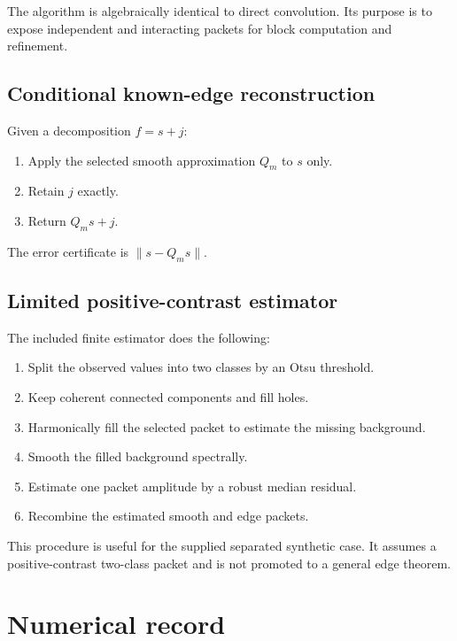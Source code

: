 \documentclass[11pt,letterpaper]{article}
\theoremstyle{plain}
\theoremstyle{plain}
\theoremstyle{plain}
\theoremstyle{definition}
\theoremstyle{definition}
\theoremstyle{definition}
\theoremstyle{definition}
\theoremstyle{remark}
\theoremstyle{remark}
\theoremstyle{remark}
\theoremstyle{remark}
\begin{document}
The algorithm is algebraically identical to direct convolution. Its purpose is to expose independent and interacting packets for block computation and refinement.

\subsection{Conditional known-edge reconstruction}

Given a decomposition $f=s+j$:

\begin{enumerate}
\item Apply the selected smooth approximation $Q_m$ to $s$ only.
\item Retain $j$ exactly.
\item Return $Q_ms+j$.
\end{enumerate}

The error certificate is $\|s-Q_ms\|$.

\subsection{Limited positive-contrast estimator}

The included finite estimator does the following:

\begin{enumerate}
\item Split the observed values into two classes by an Otsu threshold.
\item Keep coherent connected components and fill holes.
\item Harmonically fill the selected packet to estimate the missing background.
\item Smooth the filled background spectrally.
\item Estimate one packet amplitude by a robust median residual.
\item Recombine the estimated smooth and edge packets.
\end{enumerate}

This procedure is useful for the supplied separated synthetic case. It assumes a positive-contrast two-class packet and is not promoted to a general edge theorem.

\section{Numerical record}\label{core:section:19}
\end{document}
